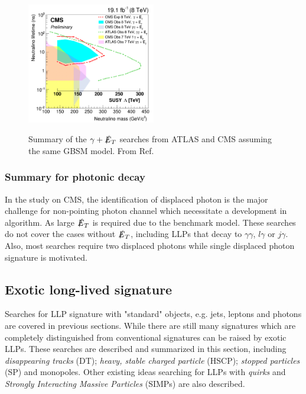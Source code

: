 \begin{figure}
    \centering
    \caption{Summary of the $\gamma + \slashed{E}_T$ searches from ATLAS and CMS assuming the same GBSM model. From Ref.\cite{CMSDelayedPhoton}}
    \includegraphics[width=0.5\textwidth]{fig/PhotonicDecay.png}
    \label{fig:photonicdecay}
\end{figure}


\subsubsection{Summary for photonic decay}
In the study on CMS, the identification of displaced photon is the major challenge for non-pointing photon channel which necessitate a development in algorithm. As large $\slashed{E}_T$  is required due to the benchmark model. These searches do not cover the cases without $\slashed{E}_T$, including LLPs that decay to $\gamma\gamma$, $l\gamma$ or $j\gamma$. Also, most searches require two displaced photons while single displaced photon signature is motivated. 

\subsection{Exotic long-lived signature}

Searches for LLP signature with "standard" objects, e.g. jets, leptons and photons are covered in previous sections. While there are still many signatures which are completely distinguished from conventional signatures can be raised by exotic LLPs. These searches are described and summarized in this section, including \textit{disappearing tracks} (DT); \textit{heavy, stable charged particle} (HSCP); \textit{stopped particles} (SP) and monopoles. Other existing ideas searching for LLPs with \textit{quirks} and \textit{Strongly Interacting Massive Particles} (SIMPs) are also described. 


